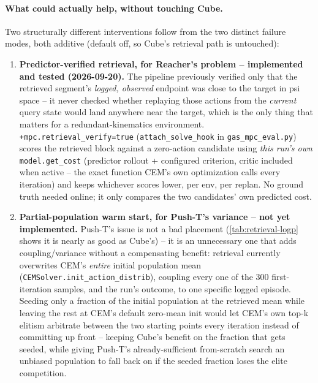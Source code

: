 \documentclass[11pt]{article}
\begin{document}
\paragraph{What could actually help, without touching Cube.} Two structurally different
interventions follow from the two distinct failure modes, both additive (default off, so
Cube's retrieval path is untouched):
\begin{enumerate}[nosep]
  \item \textbf{Predictor-verified retrieval, for Reacher's problem -- implemented and
        tested (2026-09-20).} The pipeline previously verified only that the retrieved
        segment's \emph{logged, observed} endpoint was close to the target in psi space -- it
        never checked whether replaying those actions from the \emph{current} query state
        would land anywhere near the target, which is the only thing that matters for a
        redundant-kinematics environment. \texttt{+mpc.retrieval\_verify=true}
        (\texttt{attach\_solve\_hook} in \texttt{gas\_mpc\_eval.py}) scores the retrieved block
        against a zero-action candidate using \emph{this run's own} \texttt{model.get\_cost}
        (predictor rollout + configured criterion, critic included when active -- the exact
        function CEM's own optimization calls every iteration) and keeps whichever scores
        lower, per env, per replan. No ground truth needed online; it only compares the two
        candidates' own predicted cost.
  \item \textbf{Partial-population warm start, for Push-T's variance -- not yet implemented.}
        Push-T's issue is not a bad placement (\cref{tab:retrieval-logp} shows it is nearly as
        good as Cube's) -- it is an unnecessary one that adds coupling/variance without a
        compensating benefit: retrieval currently overwrites CEM's \emph{entire} initial
        population mean (\texttt{CEMSolver.init\_action\_distrib}), coupling every one of the
        300 first-iteration samples, and the run's outcome, to one specific logged episode.
        Seeding only a fraction of the initial population at the retrieved mean while leaving
        the rest at CEM's default zero-mean init would let CEM's own top-k elitism arbitrate
        between the two starting points every iteration instead of committing up front --
        keeping Cube's benefit on the fraction that gets seeded, while giving Push-T's
        already-sufficient from-scratch search an unbiased population to fall back on if the
        seeded fraction loses the elite competition.
\end{enumerate}
\end{document}

